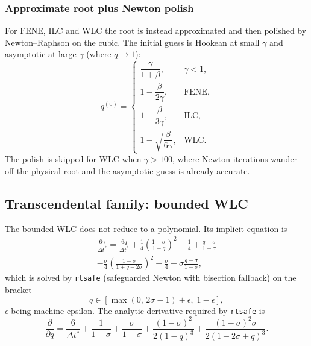 \documentclass[11pt,a4paper]{report}
\newcommand{\dt}{\Delta t^{*}}
\newcommand{\code}[1]{\texttt{\seqsplitcode{#1}}}
\newcommand{\seqsplitcode}[1]{#1}
\begin{document}
\subsubsection{Approximate root plus Newton polish}

For FENE, ILC and WLC the root is instead approximated and then polished by
Newton--Raphson on the cubic. The initial guess is Hookean at small $\gamma$ and
asymptotic at large $\gamma$ (where $q\to1$):
\begin{equation}
  q^{(0)} =
  \begin{cases}
    \dfrac{\gamma}{1+\beta}, & \gamma < 1,\\[0.8em]
    1 - \dfrac{\beta}{2\gamma}, & \text{FENE},\\[0.7em]
    1 - \dfrac{\beta}{3\gamma}, & \text{ILC},\\[0.7em]
    1 - \sqrt{\dfrac{\beta}{6\gamma}}, & \text{WLC}.
  \end{cases}
\end{equation}
The polish is skipped for WLC when $\gamma > 100$, where Newton iterations
wander off the physical root and the asymptotic guess is already accurate.

\subsection{Transcendental family: bounded WLC}

The bounded WLC does not reduce to a polynomial. Its implicit equation is
\begin{multline}
  \frac{6\gamma}{\dt} = \frac{6q}{\dt}
    + \frac{1}{4}\left(\frac{1-\sigma}{1-q}\right)^{2} - \frac{1}{4}
    + \frac{q-\sigma}{1-\sigma} \\
    - \frac{\sigma}{4}\left(\frac{1-\sigma}{1+q-2\sigma}\right)^{2}
    + \frac{\sigma}{4} + \sigma\frac{q-\sigma}{1-\sigma},
  \label{eq:wlcb-implicit}
\end{multline}
which is solved by \code{rtsafe} (safeguarded Newton with bisection fallback) on
the bracket
\begin{equation}
  q \in \left[\max(0,\,2\sigma-1)+\epsilon,\; 1-\epsilon\right],
\end{equation}
$\epsilon$ being machine epsilon. The analytic derivative required by
\code{rtsafe} is
\begin{equation}
  \frac{\partial}{\partial q} = \frac{6}{\dt} + \frac{1}{1-\sigma} + \frac{\sigma}{1-\sigma}
    + \frac{(1-\sigma)^2}{2(1-q)^3}
    + \frac{(1-\sigma)^2\sigma}{2(1-2\sigma+q)^3}.
\end{equation}
\end{document}
